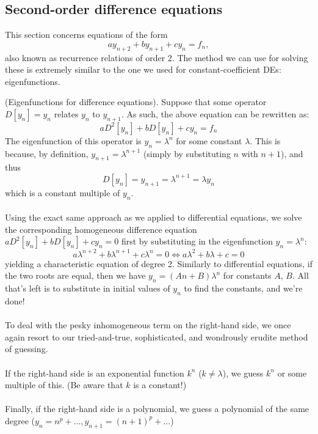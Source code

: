 \documentclass{article}
\begin{document}
\subsection{Second-order difference equations}
This section concerns equations of the form
\begin{equation*}
    ay_{n+2}+by_{n+1}+cy_{n} = f_n,
\end{equation*}
also known as recurrence relations of order 2. The method we can use for solving these is extremely similar to the one we used for constant-coefficient DEs: eigenfunctions.
\begin{method}
    (Eigenfunctions for difference equations). Suppose that some operator $D[y_n] = y_n$ relates $y_n$ to $y_{n+1}$. As such, the above equation can be rewritten as:
    \begin{equation*}
        aD^2[y_n] + bD[y_n] + cy_n = f_n
    \end{equation*}
    The eigenfunction of this operator is $y_n = \lambda^n$ for some constant $\lambda$. This is because, by definition, $y_{n+1} = \lambda^{n+1}$ (simply by substituting $n$ with $n+1$), and thus 
    \begin{equation*}
        D[y_n] = y_{n+1} = \lambda^{n+1} = \lambda y_n
    \end{equation*}
    which is a constant multiple of $y_n$. \\ \\
    Using the exact same approach as we applied to differential equations, we solve the corresponding homogeneous difference equation $aD^2[y_n] + bD[y_n] + cy_n = 0$ first by substituting in the eigenfunction $y_n = \lambda^n$:
    \begin{equation*}
        a\lambda^{n+2} + b\lambda^{n+1} + c\lambda^n = 0 \iff a\lambda^2 + b\lambda + c = 0
    \end{equation*}
    yielding a characteristic equation of degree 2. Similarly to differential equations, if the two roots are equal, then we have $y_n = (An+B)\lambda^n$ for constants $A$, $B$. All that's left is to substitute in initial values of $y_n$ to find the constants, and we're done! \\ \\
    To deal with the pesky inhomogeneous term on the right-hand side, we once again resort to our tried-and-true, sophisticated, and wondrously erudite method of guessing. \\ \\
    If the right-hand side is an exponential function $k^n$ ($k \neq \lambda$), we guess $k^n$ or some multiple of this. (Be aware that $k$ is a constant!) \\ \\
    Finally, if the right-hand side is a polynomial, we guess a polynomial of the same degree ($y_n = n^p + ..., y_{n+1} = (n+1)^p + ...$)
\end{method}
\newpage
\end{document}
